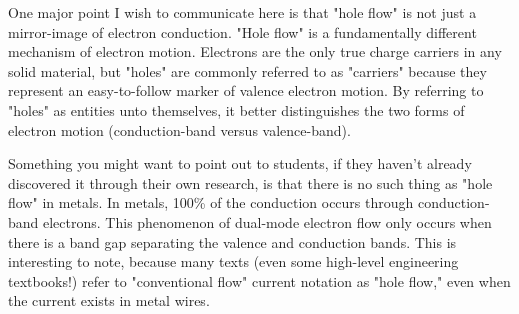One major point I wish to communicate here is that "hole flow" is not just a mirror-image of electron conduction.  "Hole flow" is a fundamentally different mechanism of electron motion.  Electrons are the only true charge carriers in any solid material, but "holes" are commonly referred to as "carriers" because they represent an easy-to-follow marker of valence electron motion.  By referring to "holes" as entities unto themselves, it better distinguishes the two forms of electron motion (conduction-band versus valence-band).

Something you might want to point out to students, if they haven't already discovered it through their own research, is that there is no such thing as "hole flow" in metals.  In metals, 100\% of the conduction occurs through conduction-band electrons.  This phenomenon of dual-mode electron flow only occurs when there is a band gap separating the valence and conduction bands.  This is interesting to note, because many texts (even some high-level engineering textbooks!) refer to "conventional flow" current notation as "hole flow," even when the current exists in metal wires.




